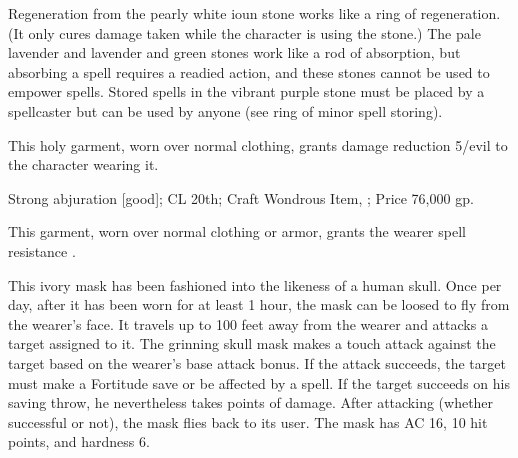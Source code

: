 Regeneration from the pearly white ioun stone works like a ring of regeneration. (It only cures damage taken while the character is using the stone.) The pale lavender and lavender and green stones work like a rod of absorption, but absorbing a spell requires a readied action, and these stones cannot be used to empower spells. Stored spells in the vibrant purple stone must be placed by a spellcaster but can be used by anyone (see ring of minor spell storing).

 This holy garment, worn over normal clothing, grants damage reduction 5/evil to the character wearing it.

Strong abjuration [good]; CL 20th; Craft Wondrous Item, ; Price 76,000 gp.

 This garment, worn over normal clothing or armor, grants the wearer spell resistance .

 This ivory mask has been fashioned into the likeness of a human skull. Once per day, after it has been worn for at least 1 hour, the mask can be loosed to fly from the wearer's face. It travels up to 100 feet away from the wearer and attacks a target assigned to it. The grinning skull mask makes a touch attack against the target based on the wearer's base attack bonus. If the attack succeeds, the target must make a Fortitude save or be affected by a  spell. If the target succeeds on his saving throw, he nevertheless takes  points of damage. After attacking (whether successful or not), the mask flies back to its user. The mask has AC 16, 10 hit points, and hardness 6.

